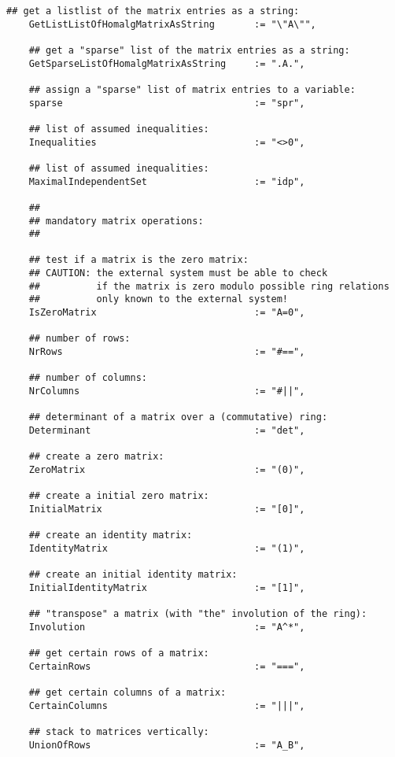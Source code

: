 \documentclass[a4paper,11pt]{report}
\begin{document}
{{{\begin{Verbatim}[fontsize=\small,frame=single,label=Code]
    ## get a listlist of the matrix entries as a string:
    GetListListOfHomalgMatrixAsString       := "\"A\"",
    
    ## get a "sparse" list of the matrix entries as a string:
    GetSparseListOfHomalgMatrixAsString     := ".A.",
    
    ## assign a "sparse" list of matrix entries to a variable:
    sparse                                  := "spr",
    
    ## list of assumed inequalities:
    Inequalities                            := "<>0",
    
    ## list of assumed inequalities:
    MaximalIndependentSet                   := "idp",
    
    ##
    ## mandatory matrix operations:
    ##
    
    ## test if a matrix is the zero matrix:
    ## CAUTION: the external system must be able to check
    ##          if the matrix is zero modulo possible ring relations
    ##          only known to the external system!
    IsZeroMatrix                            := "A=0",
    
    ## number of rows:
    NrRows                                  := "#==",
    
    ## number of columns:
    NrColumns                               := "#||",
    
    ## determinant of a matrix over a (commutative) ring:
    Determinant                             := "det",
    
    ## create a zero matrix:
    ZeroMatrix                              := "(0)",
    
    ## create a initial zero matrix:
    InitialMatrix                           := "[0]",
    
    ## create an identity matrix:
    IdentityMatrix                          := "(1)",
    
    ## create an initial identity matrix:
    InitialIdentityMatrix                   := "[1]",
    
    ## "transpose" a matrix (with "the" involution of the ring):
    Involution                              := "A^*",
    
    ## get certain rows of a matrix:
    CertainRows                             := "===",
    
    ## get certain columns of a matrix:
    CertainColumns                          := "|||",
    
    ## stack to matrices vertically:
    UnionOfRows                             := "A_B",
    

\end{Verbatim}}}}
\end{document}
